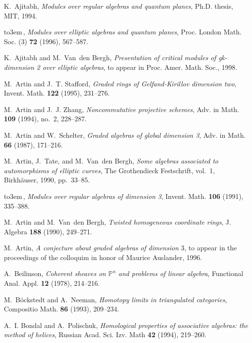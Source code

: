 \documentclass{amsproc}
\def \PP{{\mathbb P}}
\theoremstyle{definition}
\theoremstyle{remark}
\numberwithin{equation}{section}
\numberwithin{table}{section}
\numberwithin{figure}{section}
\begin{document}
\ifx\undefined\bysame
\newcommand{\bysame}{\leavevmode\hbox to3em{\hrulefill}\,}
\fi
\begin{thebibliography}{10}

K.~Ajitabh, {\em Modules over regular algebras and quantum planes}, Ph.D.
  thesis, MIT, 1994.

\bysame, {\em Modules over elliptic algebras and quantum planes}, Proc. London
  Math. Soc. (3) {\bf 72} (1996), 567--587.

K.~Ajitabh and M.~Van~den Bergh, {\em Presentation of critical modules of
  gk-dimension 2 over elliptic algebras}, to appear in Proc. Amer. Math. Soc.,
  1998.

M.~Artin and J.~T. Stafford, {\em Graded rings of {G}elfand-{K}irillov
  dimension two}, Invent. Math. {\bf 122} (1995), 231--276.

M.~Artin and J.~J. Zhang, {\em Noncommutative projective schemes}, Adv. in
  Math. {\bf 109} (1994), no.~2, 228--287.

M.~Artin and W.~Schelter, {\em Graded algebras of global dimension 3}, Adv. in
  Math. {\bf 66} (1987), 171--216.

M.~Artin, J.~Tate, and M.~Van~den Bergh, {\em Some algebras associated to
  automorphisms of elliptic curves}, The Grothendieck Festschrift, vol.~1,
  Birkh\"auser, 1990, pp.~33--85.

\bysame, {\em Modules over regular algebras of dimension 3}, Invent. Math. {\bf
  106} (1991), 335--388.

M.~Artin and M.~Van~den Bergh, {\em Twisted homogeneous coordinate rings}, J.
  Algebra {\bf 188} (1990), 249--271.

M.~Artin, {\em A conjecture about graded algebras of dimension $3$}, to appear
  in the proceedings of the colloquim in honor of Maurice Auslander, 1996.

A.~Beilinson, {\em Coherent sheaves on {$\PP^n$} and problems of linear
  algebra}, Functional Anal. Appl. {\bf 12} (1978), 214--216.

M.~B{\"o}ckstedt and A.~Neeman, {\em Homotopy limits in triangulated
  categories}, Compositio Math. {\bf 86} (1993), 209--234.

A.~I. Bondal and A.~Polischuk, {\em Homological properties of associative
  algebras: the method of helices}, Russian Acad. Sci. Izv. Math {\bf 42}
  (1994), 219--260.


\end{thebibliography}
\end{document}
